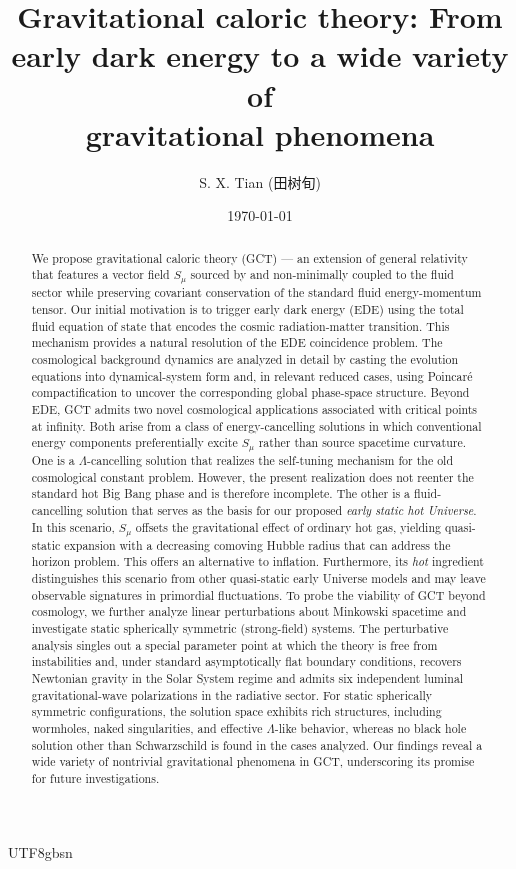 \documentclass[aps,prd,twocolumn]{revtex4-2}
\begin{document}
\begin{CJK*}{UTF8}{gbsn}
\title{Gravitational caloric theory: From early dark energy to a wide variety of \\ gravitational phenomena}
\author{S. X. Tian (田树旬)}
\date{\today}
\begin{abstract}
  We propose gravitational caloric theory (GCT) --- an extension of general relativity that features a vector field $S_\mu$ sourced by and non-minimally coupled to the fluid sector while preserving covariant conservation of the standard fluid energy-momentum tensor. Our initial motivation is to trigger early dark energy (EDE) using the total fluid equation of state that encodes the cosmic radiation-matter transition. This mechanism provides a natural resolution of the EDE coincidence problem. The cosmological background dynamics are analyzed in detail by casting the evolution equations into dynamical-system form and, in relevant reduced cases, using Poincar\'e compactification to uncover the corresponding global phase-space structure. Beyond EDE, GCT admits two novel cosmological applications associated with critical points at infinity. Both arise from a class of energy-cancelling solutions in which conventional energy components preferentially excite $S_\mu$ rather than source spacetime curvature. One is a $\Lambda$-cancelling solution that realizes the self-tuning mechanism for the old cosmological constant problem. However, the present realization does not reenter the standard hot Big Bang phase and is therefore incomplete. The other is a fluid-cancelling solution that serves as the basis for our proposed \textit{early static hot Universe}. In this scenario, $S_\mu$ offsets the gravitational effect of ordinary hot gas, yielding quasi-static expansion with a decreasing comoving Hubble radius that can address the horizon problem. This offers an alternative to inflation. Furthermore, its \textit{hot} ingredient distinguishes this scenario from other quasi-static early Universe models and may leave observable signatures in primordial fluctuations. To probe the viability of GCT beyond cosmology, we further analyze linear perturbations about Minkowski spacetime and investigate static spherically symmetric (strong-field) systems. The perturbative analysis singles out a special parameter point at which the theory is free from instabilities and, under standard asymptotically flat boundary conditions, recovers Newtonian gravity in the Solar System regime and admits six independent luminal gravitational-wave polarizations in the radiative sector. For static spherically symmetric configurations, the solution space exhibits rich structures, including wormholes, naked singularities, and effective $\Lambda$-like behavior, whereas no black hole solution other than Schwarzschild is found in the cases analyzed. Our findings reveal a wide variety of nontrivial gravitational phenomena in GCT, underscoring its promise for future investigations.

\end{abstract}
\end{CJK*}
\end{document}
